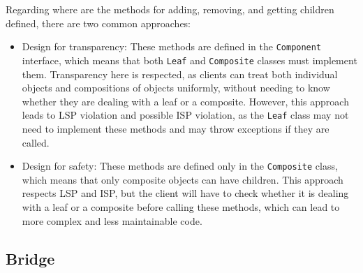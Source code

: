 Regarding where are the methods for adding, removing, and getting children defined, there are two common approaches:
\begin{itemize}
    \item Design for transparency: These methods are defined in the \texttt{Component} interface, which means that both \texttt{Leaf} and \texttt{Composite} classes must implement them. Transparency here is respected, as clients can treat both individual objects and compositions of objects uniformly, without needing to know whether they are dealing with a leaf or a composite. However, this approach leads to LSP violation and possible ISP violation, as the \texttt{Leaf} class may not need to implement these methods and may throw exceptions if they are called.
    \item Design for safety: These methods are defined only in the \texttt{Composite} class, which means that only composite objects can have children. This approach respects LSP and ISP, but the client will have to check whether it is dealing with a leaf or a composite before calling these methods, which can lead to more complex and less maintainable code.
\end{itemize}

\subsection{Bridge}

